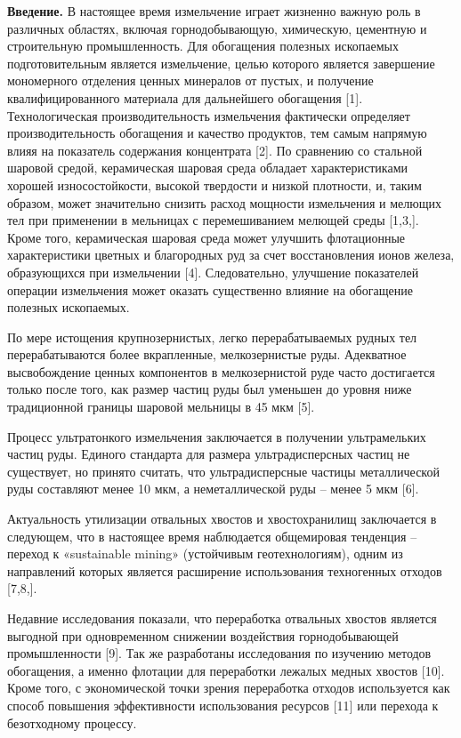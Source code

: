 \begin{multicols}{2}
{\bfseries Введение.} В настоящее время измельчение играет жизненно важную
роль в различных областях, включая горнодобывающую, химическую,
цементную и строительную промышленность. Для обогащения полезных
ископаемых подготовительным является измельчение, целью которого
является завершение мономерного отделения ценных минералов от пустых, и
получение квалифицированного материала для дальнейшего обогащения
{[}1{]}. Технологическая производительность измельчения фактически
определяет производительность обогащения и качество продуктов, тем самым
напрямую влияя на показатель содержания концентрата {[}2{]}. По
сравнению со стальной шаровой средой, керамическая шаровая среда
обладает характеристиками хорошей износостойкости, высокой твердости и
низкой плотности, и, таким образом, может значительно снизить расход
мощности измельчения и мелющих тел при применении в мельницах с
перемешиванием мелющей среды {[}1,3,{]}. Кроме того, керамическая
шаровая среда может улучшить флотационные характеристики цветных и
благородных руд за счет восстановления ионов железа, образующихся при
измельчении {[}4{]}. Следовательно, улучшение показателей операции
измельчения может оказать существенно влияние на обогащение полезных
ископаемых.

По мере истощения крупнозернистых, легко перерабатываемых рудных тел
перерабатываются более вкрапленные, мелкозернистые руды. Адекватное
высвобождение ценных компонентов в мелкозернистой руде часто достигается
только после того, как размер частиц руды был уменьшен до уровня ниже
традиционной границы шаровой мельницы в 45 мкм {[}5{]}.

Процесс ультратонкого измельчения заключается в получении ультрамельких
частиц руды. Единого стандарта для размера ультрадисперсных частиц не
существует, но принято считать, что ультрадисперсные частицы
металлической руды составляют менее 10 мкм, а неметаллической руды --
менее 5 мкм {[}6{]}.

Актуальность утилизации отвальных хвостов и хвостохранилищ заключается в
следующем, что в настоящее время наблюдается общемировая тенденция --
переход к «sustainable mining» (устойчивым геотехнологиям), одним из
направлений которых является расширение использования техногенных
отходов {[}7,8,{]}.

Недавние исследования показали, что переработка отвальных хвостов
является выгодной при одновременном снижении воздействия горнодобывающей
промышленности {[}9{]}. Так же разработаны исследования по изучению
методов обогащения, а именно флотации для переработки лежалых медных
хвостов {[}10{]}. Кроме того, с экономической точки зрения переработка
отходов используется как способ повышения эффективности использования
ресурсов {[}11{]} или перехода к безотходному процессу.


\end{multicols}

